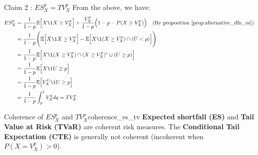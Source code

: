\begin{proof*}
    \begin{subproof}{\newline Claim 2 : $ES_X^p = TV_X^p$}
        From the above, we have:
        \begin{align*}
            ES_X^p &= \frac{1}{1-p}\mathbb{E}\Big[ X\1{X\ge V_X^p}\Big] + \frac{V_X^p}{1-p}\Big( 1 - p - P(X\ge V_X^p) \Big) \ \ \ \text{(By proposition \ref{prop:alternative_dfn_es})} \\
            &= \frac{1}{1-p}\Bigg( \mathbb{E}\Big[ X\1{X\ge V_X^p}\Big] - \mathbb{E}\Big[ X \1{(X \ge V_X^p)\cap (U < p)} \Big] \Bigg) \\
            &= \frac{1}{1-p}\mathbb{E}\Big[ X\1{(X\ge V_X^p) \cap (X\ge V_X^p)^c \cup (U \ge p)}\Big] \\
            &= \frac{1}{1-p}\mathbb{E}\Big[ X\1{U \ge p}\Big] \\
            &= \frac{1}{1-p}\mathbb{E}\Big[ V_X^U\1{U \ge p}\Big] \\
            &= \frac{1}{1-p}\int_p^1 V_X^qdq = TV_X^p
        \end{align*}
    \end{subproof}
\end{proof*}

\begin{theorem}{Coherence of $ES_X^p$ and $TV_X^p$}{coherence_es_tv}
    \textbf{Expected shortfall (ES)} and \textbf{Tail Value at Risk (TVaR)} are coherent risk measures. The \textbf{Conditional Tail Expectation (CTE)} is generally not coherent (incoherent when $P(X=V_X^p)>0$). 
\end{theorem}

